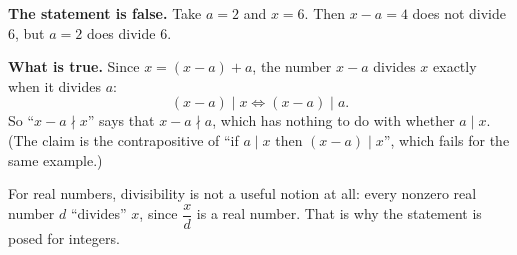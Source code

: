 \textbf{The statement is false.} Take $a=2$ and $x=6$. Then $x-a=4$ does not divide $6$, but $a=2$ does divide $6$.

\textbf{What is true.} Since $x=(x-a)+a$, the number $x-a$ divides $x$ exactly when it divides $a$:
\[
(x-a)\mid x\iff(x-a)\mid a .
\]
So ``$x-a\nmid x$'' says that $x-a\nmid a$, which has nothing to do with whether $a\mid x$. (The claim is the contrapositive of ``if $a\mid x$ then $(x-a)\mid x$'', which fails for the same example.)

For real numbers, divisibility is not a useful notion at all: every nonzero real number $d$ ``divides'' $x$, since $\dfrac {x}{d}$ is a real number. That is why the statement is posed for integers.
